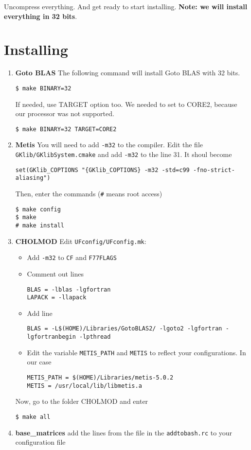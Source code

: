 \documentclass[letterpaper,11pt]{article}
\numberwithin{equation}{section}
\newcommand{\makesec}[1]{\section[#1]{#1}}
\begin{document}
Uncompress everything. And get ready to start installing. {\bf Note: we will install everything in 32 bits}.

\makesec{Installing}

\begin{enumerate}
 \item {\bf Goto BLAS} The following command will install Goto BLAS with 32 bits.
\begin{verbatim}
$ make BINARY=32
\end{verbatim}
If needed, use TARGET option too. We needed to set to CORE2, because our processor was not supported.
\begin{verbatim}
$ make BINARY=32 TARGET=CORE2
\end{verbatim}
 \item {\bf Metis} You will need to add \verb+-m32+ to the compiler. Edit the file \verb+GKlib/GKlibSystem.cmake+ and add \verb+-m32+ to the line 31. It shoul become
\begin{verbatim}
set(GKlib_COPTIONS "{GKlib_COPTIONS} -m32 -std=c99 -fno-strict-aliasing")
\end{verbatim}
Then, enter the commands (\verb+#+ means root access)
\begin{verbatim}
$ make config
$ make
# make install
\end{verbatim}
 \item {\bf CHOLMOD} Edit \verb+UFconfig/UFconfig.mk+:
  \begin{itemize}
   \item Add \verb+-m32+ to \verb+CF+ and \verb+F77FLAGS+
   \item Comment out lines
\begin{verbatim}
BLAS = -lblas -lgfortran
LAPACK = -llapack
\end{verbatim}
   \item Add line
\begin{verbatim}
BLAS = -L$(HOME)/Libraries/GotoBLAS2/ -lgoto2 -lgfortran -lgfortranbegin -lpthread
\end{verbatim}
  \item Edit the variable \verb+METIS_PATH+ and \verb+METIS+ to reflect your configurations. In our case
    \begin{verbatim} 
METIS_PATH = $(HOME)/Libraries/metis-5.0.2
METIS = /usr/local/lib/libmetis.a
    \end{verbatim}
  \end{itemize}
  Now, go to the folder CHOLMOD and enter
\begin{verbatim}
$ make all
\end{verbatim}
 \item {\bf base\_matrices} add the lines from the file in the \verb+addtobash.rc+ to your configuration file 


\end{enumerate}
\end{document}
